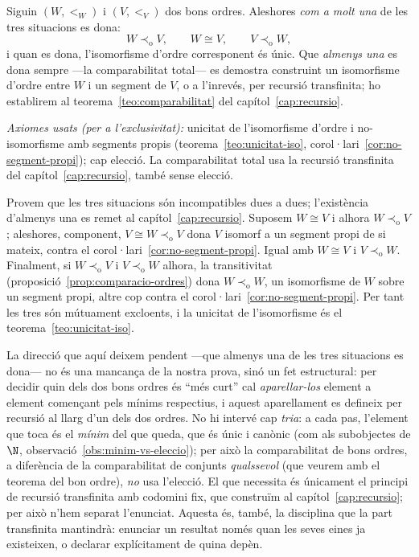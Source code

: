 \begin{teorema}\label{teo:tricotomia}
Siguin \((W,<_W)\) i \((V,<_V)\) dos bons ordres. Aleshores \emph{com a molt
una} de les tres situacions es dona:
\[
W\prec_{\mathrm o}V,
\qquad
W\cong V,
\qquad
V\prec_{\mathrm o}W,
\]
i quan es dona, l'isomorfisme d'ordre corresponent és únic. Que \emph{almenys
una} es dona sempre ---la comparabilitat total--- es demostra construint un
isomorfisme d'ordre entre \(W\) i un segment de \(V\), o a l'inrevés, per
recursió transfinita; ho establirem al teorema~\ref{teo:comparabilitat} del
capítol~\ref{cap:recursio}.\par
\emph{Axiomes usats (per a l'exclusivitat):} unicitat de l'isomorfisme
d'ordre i no-isomorfisme amb segments propis
(teorema~\ref{teo:unicitat-iso}, corol·lari~\ref{cor:no-segment-propi}); cap
elecció. La comparabilitat total usa la recursió
transfinita del capítol~\ref{cap:recursio}, també sense elecció.
\end{teorema}

\begin{prova}
Provem que les tres situacions són incompatibles dues a dues; l'existència
d'almenys una es remet al capítol~\ref{cap:recursio}.
Suposem \(W\cong V\) i
alhora \(W\prec_{\mathrm o}V\); aleshores, component, \(V\cong W\prec_{\mathrm
o}V\) dona \(V\) isomorf a un segment propi de si mateix, contra el
corol·lari~\ref{cor:no-segment-propi}. Igual amb \(W\cong V\) i
\(V\prec_{\mathrm o}W\). Finalment, si \(W\prec_{\mathrm o}V\) i
\(V\prec_{\mathrm o}W\) alhora, la transitivitat
(proposició~\ref{prop:comparacio-ordres}) dona \(W\prec_{\mathrm o}W\), un
isomorfisme de \(W\) sobre un segment propi, altre cop contra el
corol·lari~\ref{cor:no-segment-propi}. Per tant les tres són mútuament
excloents, i la unicitat de l'isomorfisme és el
teorema~\ref{teo:unicitat-iso}.
\end{prova}

\begin{observacio}\label{obs:tricotomia-recursio}
La direcció que aquí deixem pendent ---que almenys una de les tres situacions
es dona--- no és una mancança de la nostra prova, sinó un fet estructural:
per decidir quin dels dos bons ordres és \enquote{més curt} cal
\emph{aparellar-los} element a element començant pels mínims respectius, i
aquest aparellament es defineix per recursió al llarg d'un dels dos ordres.
No hi intervé cap \emph{tria}: a cada pas, l'element que toca és el
\emph{mínim} del que queda, que és únic i canònic (com als subobjectes de
\(\N\), observació~\ref{obs:minim-vs-eleccio}); per això la comparabilitat de
bons ordres, a diferència de la comparabilitat de conjunts \emph{qualssevol}
(que veurem amb el teorema del bon ordre), \emph{no} usa l'elecció. El que necessita és
únicament el principi de recursió transfinita amb codomini fix, que
construïm al capítol~\ref{cap:recursio}; per això n'hem separat l'enunciat.
Aquesta és, també, la disciplina que la part transfinita mantindrà: enunciar
un resultat només quan les seves eines ja existeixen, o declarar
explícitament de quina depèn.
\end{observacio}

